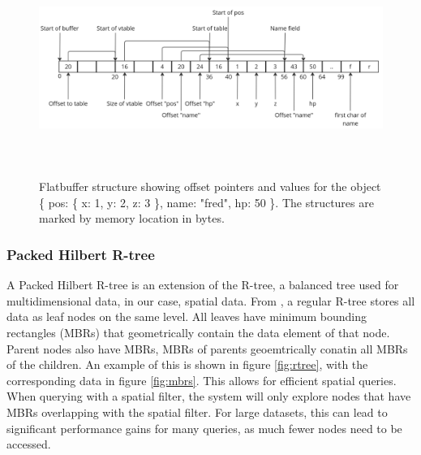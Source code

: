 \begin{figure}
    \centering
    \includegraphics[width=\linewidth, height=7cm, keepaspectratio]{./figures/flatbuf.png}
    \caption{Flatbuffer structure showing offset pointers and values for the object \{ pos: \{ x: 1, y: 2, z: 3 \}, name: "fred", hp: 50 \}. The structures are marked by memory location in bytes.}
    \label{fig:flatbuf}
\end{figure}

\subsubsection{Packed Hilbert R-tree}
A Packed Hilbert R-tree is an extension of the R-tree, a balanced tree used for multidimensional data, in our case, spatial data. From \cite{rtree}, a regular R-tree stores all data as leaf nodes on the same level. All leaves have minimum bounding rectangles (MBRs) that geometrically contain the data element of that node. Parent nodes also have MBRs, MBRs of parents geoemtrically conatin all MBRs of the children. An example of this is shown in figure \ref{fig:rtree}, with the corresponding data in figure \ref{fig:mbrs}. This allows for efficient spatial queries. When querying with a spatial filter, the system will only explore nodes that have MBRs overlapping with the spatial filter. For large datasets, this can lead to significant performance gains for many queries, as much fewer nodes need to be accessed.

